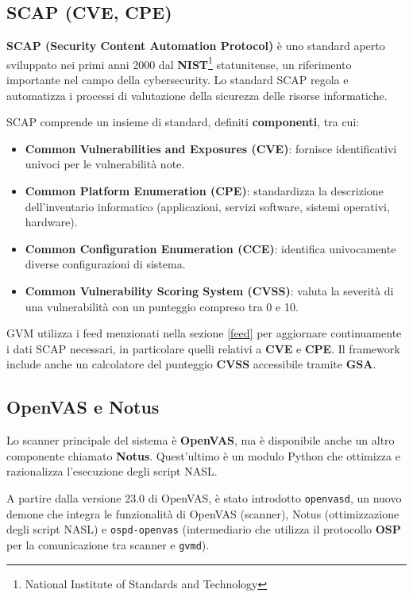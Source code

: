 \subsection{SCAP (CVE, CPE)}
\textbf{SCAP (Security Content Automation Protocol)} è uno standard aperto sviluppato nei primi anni 2000 dal \textbf{NIST}\footnote{National Institute of Standards and Technology} statunitense, un riferimento importante nel campo della cybersecurity. Lo standard SCAP regola e automatizza i processi di valutazione della sicurezza delle risorse informatiche.

SCAP comprende un insieme di standard, definiti \textbf{componenti}, tra cui:
\begin{itemize}
    \item \textbf{Common Vulnerabilities and Exposures (CVE)}: fornisce identificativi univoci per le vulnerabilità note.
    \item \textbf{Common Platform Enumeration (CPE)}: standardizza la descrizione dell'inventario informatico (applicazioni, servizi software, sistemi operativi, hardware).
    \item \textbf{Common Configuration Enumeration (CCE)}: identifica univocamente diverse configurazioni di sistema.
    \item \textbf{Common Vulnerability Scoring System (CVSS)}: valuta la severità di una vulnerabilità con un punteggio compreso tra 0 e 10.
\end{itemize}

GVM utilizza i feed menzionati nella sezione \ref{feed} per aggiornare continuamente i dati SCAP necessari, in particolare quelli relativi a \textbf{CVE} e \textbf{CPE}. Il framework include anche un calcolatore del punteggio \textbf{CVSS} accessibile tramite \textbf{GSA}.

\subsection{OpenVAS e Notus}
\label{notus}
Lo scanner principale del sistema è \textbf{OpenVAS}, ma è disponibile anche un altro componente chiamato \textbf{Notus}. Quest'ultimo è un modulo Python che ottimizza e razionalizza l'esecuzione degli script NASL.

\label{openvasd}
A partire dalla versione 23.0 di OpenVAS, è stato introdotto \texttt{openvasd}, un nuovo demone che integra le funzionalità di OpenVAS (scanner), Notus (ottimizzazione degli script NASL) e \texttt{ospd-openvas} (intermediario che utilizza il protocollo \textbf{OSP} per la comunicazione tra scanner e \texttt{gvmd}).

